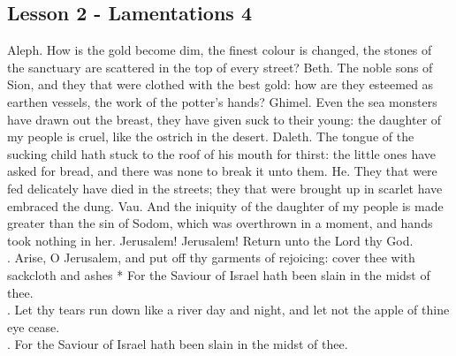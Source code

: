 \subsection{Lesson 2 - Lamentations 4}
\begin{Parallel}[v]{\colw}{\colx}
{}
{\vern
{\noindent
Aleph. How is the gold become dim, the finest colour is changed, the stones of the sanctuary are scattered in the top of every street?
Beth. The noble sons of Sion, and they that were clothed with the best gold: how are they esteemed as earthen vessels, the work of the potter's hands?
Ghimel. Even the sea monsters have drawn out the breast, they have given suck to their young: the daughter of my people is cruel, like the ostrich in the desert.
Daleth. The tongue of the sucking child hath stuck to the roof of his mouth for thirst: the little ones have asked for bread, and there was none to break it unto them.
He. They that were fed delicately have died in the streets; they that were brought up in scarlet have embraced the dung.
Vau. And the iniquity of the daughter of my people is made greater than the sin of Sodom, which was overthrown in a moment, and hands took nothing in her.
Jerusalem! Jerusalem! Return unto the Lord thy God.\\
\Rbar. Arise, O Jerusalem, and put off thy garments of rejoicing: cover thee with sackcloth and ashes
* For the Saviour of Israel hath been slain in the midst of thee.\\
\Vbar. Let thy tears run down like a river day and night, and let not the apple of thine eye cease.\\
\Rbar. For the Saviour of Israel hath been slain in the midst of thee.}}

\end{Parallel}